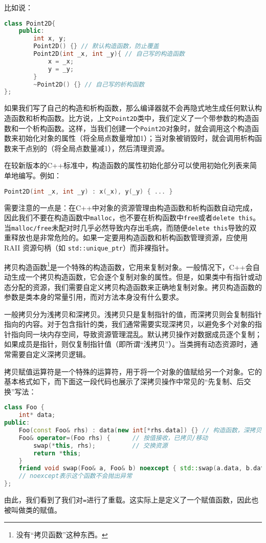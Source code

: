 比如说：
\begin{lstlisting}[language=C++]
class Point2D{
    public:
        int x, y;
        Point2D() {} // 默认构造函数，防止覆盖
        Point2D(int _x, int _y){ // 自己写的构造函数
            x = _x;
            y = _y;
        }
        ~Point2D() {} // 自己写的析构函数
};
\end{lstlisting}

如果我们写了自己的构造和析构函数，那么编译器就不会再隐式地生成任何默认构造函数和析构函数。比方说，上文\texttt{Point2D}类中，我们定义了一个带参数的构造函数和一个析构函数。这样，当我们创建一个\texttt{Point2D}对象时，就会调用这个构造函数来初始化对象的属性（将全局点数量增加1）；当对象被销毁时，就会调用析构函数来干点别的（将全局点数量减1），然后清理资源。

在较新版本的C++标准中，构造函数的属性初始化部分可以使用初始化列表来简单地编写。例如：
\begin{lstlisting}[language=C++]
Point2D(int _x, int _y) : x(_x), y(_y) { ... }
\end{lstlisting}

\begin{note}
  需要注意的一点是：在C++中对象的资源管理由构造函数和析构函数自动完成，因此我们不要在构造函数中\texttt{malloc}，也不要在析构函数中\texttt{free}或者\texttt{delete this}。当\texttt{malloc/free}未配对时几乎必然导致内存出毛病，而随便\texttt{delete this}导致的双重释放也是非常危险的。如果一定要用构造函数和析构函数管理资源，应使用 RAII 资源句柄（如 \texttt{std::unique\_ptr}）而非裸指针。
\end{note}

拷贝构造函数\footnote{没有“拷贝函数”这种东西。}是一个特殊的构造函数，它用来复制对象。一般情况下，C++会自动生成一个拷贝构造函数，它会逐个复制对象的属性。但是，如果类中有指针或动态分配的资源，我们需要自定义拷贝构造函数来正确地复制对象。拷贝构造函数的参数是类本身的常量引用，而对方法本身没有什么要求。

一般拷贝分为浅拷贝和深拷贝。浅拷贝只是复制指针的值，而深拷贝则会复制指针指向的内容。对于包含指针的类，我们通常需要实现深拷贝，以避免多个对象的指针指向同一块内存空间，导致资源管理混乱。默认拷贝操作对数据成员逐个复制；如果成员是指针，则仅复制指针值（即所谓“浅拷贝”）。当类拥有动态资源时，通常需要自定义深拷贝逻辑。

拷贝赋值运算符是一个特殊的运算符，用于将一个对象的值赋给另一个对象。它的基本格式如下，而下面这一段代码也展示了深拷贝操作中常见的“先复制、后交换”写法：
\begin{lstlisting}[language=C++]
class Foo {
    int* data;
public:
    Foo(const Foo& rhs) : data(new int[*rhs.data]) {} // 构造函数，深拷贝
    Foo& operator=(Foo rhs) {      // 按值接收，已拷贝/移动
        swap(*this, rhs);          // 交换资源
        return *this;
    }
    friend void swap(Foo& a, Foo& b) noexcept { std::swap(a.data, b.data); }
    // noexcept表示这个函数不会抛出异常
};
\end{lstlisting}
由此，我们看到了我们对\texttt{=}进行了重载。这实际上是定义了一个赋值函数，因此也被叫做类的赋值。

